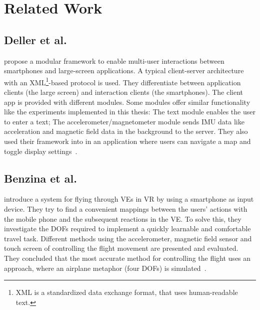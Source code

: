 \chapter{Related Work}\label{chapter:related-work}


\section{Deller et al.}\label{section:deller-2011}
\citeauthor{Deller.2011} propose a modular framework to enable multi-user interactions between smartphones and large-screen applications. A typical client-server architecture with an XML\footnote{XML is a standardized data exchange format, that uses human-readable text.}-based protocol is used. They differentiate between application clients (the large screen) and interaction clients (the smartphones). The client app is provided with different modules. Some modules offer similar functionality like the experiments implemented in this thesis: The text module enables the user to enter a text; The accelerometer/magnetometer module sends \ac{IMU} data like acceleration and magnetic field data in the background to the server. They also used their framework into in an application where users can navigate a map and toggle display settings~\cite{Deller.2011}.


\section{Benzina et al.}\label{section:benzina-2011}
\citeauthor{Benzina.2011} introduce a system for flying through \acp{VE} in \ac{VR} by using a smartphone as input device.%
They try to find a convenient mappings between the users' actions with the mobile phone and the subsequent reactions in the \ac{VE}. To solve this, they investigate the \acp{DOF} required to implement a quickly learnable and comfortable travel task. Different methods using the accelerometer, magnetic field sensor and touch screen of controlling the flight movement are presented and evaluated. They concluded that the most accurate method for controlling the flight uses an approach, where an airplane metaphor (four \acp{DOF}) is simulated~\cite{Benzina.2011}.


